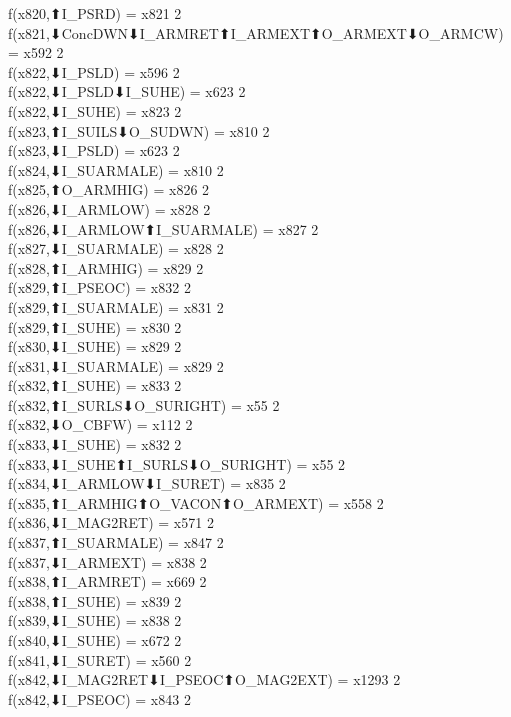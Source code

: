 f(x820,⬆I_PSRD) = x821 {2} \\
f(x821,⬇ConcDWN⬇I_ARMRET⬆I_ARMEXT⬆O_ARMEXT⬇O_ARMCW) = x592 {2} \\
f(x822,⬇I_PSLD) = x596 {2} \\
f(x822,⬇I_PSLD⬇I_SUHE) = x623 {2} \\
f(x822,⬇I_SUHE) = x823 {2} \\
f(x823,⬆I_SUILS⬇O_SUDWN) = x810 {2} \\
f(x823,⬇I_PSLD) = x623 {2} \\
f(x824,⬇I_SUARMALE) = x810 {2} \\
f(x825,⬆O_ARMHIG) = x826 {2} \\
f(x826,⬇I_ARMLOW) = x828 {2} \\
f(x826,⬇I_ARMLOW⬆I_SUARMALE) = x827 {2} \\
f(x827,⬇I_SUARMALE) = x828 {2} \\
f(x828,⬆I_ARMHIG) = x829 {2} \\
f(x829,⬆I_PSEOC) = x832 {2} \\
f(x829,⬆I_SUARMALE) = x831 {2} \\
f(x829,⬆I_SUHE) = x830 {2} \\
f(x830,⬇I_SUHE) = x829 {2} \\
f(x831,⬇I_SUARMALE) = x829 {2} \\
f(x832,⬆I_SUHE) = x833 {2} \\
f(x832,⬆I_SURLS⬇O_SURIGHT) = x55 {2} \\
f(x832,⬇O_CBFW) = x112 {2} \\
f(x833,⬇I_SUHE) = x832 {2} \\
f(x833,⬇I_SUHE⬆I_SURLS⬇O_SURIGHT) = x55 {2} \\
f(x834,⬇I_ARMLOW⬇I_SURET) = x835 {2} \\
f(x835,⬆I_ARMHIG⬆O_VACON⬆O_ARMEXT) = x558 {2} \\
f(x836,⬇I_MAG2RET) = x571 {2} \\
f(x837,⬆I_SUARMALE) = x847 {2} \\
f(x837,⬇I_ARMEXT) = x838 {2} \\
f(x838,⬆I_ARMRET) = x669 {2} \\
f(x838,⬆I_SUHE) = x839 {2} \\
f(x839,⬇I_SUHE) = x838 {2} \\
f(x840,⬇I_SUHE) = x672 {2} \\
f(x841,⬇I_SURET) = x560 {2} \\
f(x842,⬇I_MAG2RET⬇I_PSEOC⬆O_MAG2EXT) = x1293 {2} \\
f(x842,⬇I_PSEOC) = x843 {2} \\
